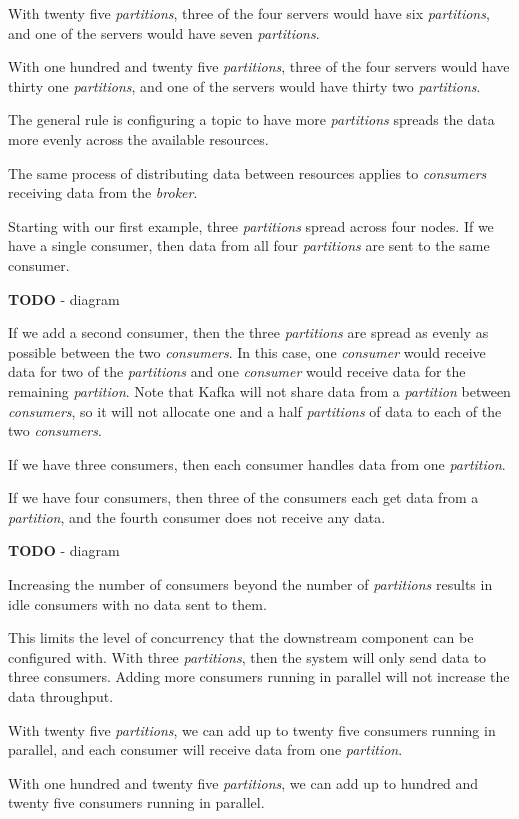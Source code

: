 \documentclass{article}
\newcommand{\kafka} {Kafka\xspace}
\newcommand{\kfbroker} {\textit{broker}\xspace}
\newcommand{\kfconsumer} {\textit{consumer}\xspace}
\newcommand{\kfconsumers} {\textit{consumers}\xspace}
\newcommand{\kfpartition} {\textit{partition}\xspace}
\newcommand{\kfpartitions} {\textit{partitions}\xspace}
\begin{document}
With twenty five \kfpartitions, three of the four servers would have six
\kfpartitions, and one of the servers would have seven \kfpartitions.

With one hundred and twenty five \kfpartitions, three of the four servers would have thirty one \kfpartitions, and one of the servers would have thirty two \kfpartitions.

The general rule is configuring a topic to have more \kfpartitions spreads the data more evenly across the available resources.

The same process of distributing data between resources applies to \kfconsumers receiving data from the \kfbroker.

Starting with our first example, three \kfpartitions spread across four nodes. If we have a single consumer, then data from all four \kfpartitions are sent to the same consumer.

\textbf{TODO} - diagram

If we add a second consumer, then the three \kfpartitions are spread as evenly as possible between the two \kfconsumers. In this case, one \kfconsumer would receive data for two of the \kfpartitions and one \kfconsumer would receive data for the remaining \kfpartition.
Note that \kafka will not share data from a \kfpartition between \kfconsumers, so it will not allocate one and a half \kfpartitions of data to each of the two \kfconsumers.

If we have three consumers, then each consumer handles data from one \kfpartition.

If we have four consumers, then three of the consumers each get data from a \kfpartition, and the fourth consumer does not receive any data.

\textbf{TODO} - diagram

Increasing the number of consumers beyond the number of \kfpartitions
results in idle consumers with no data sent to them.

This limits the level of concurrency that the downstream component can be configured with. With three \kfpartitions, then the system will only send data to three consumers.
Adding more consumers running in parallel will not increase the data throughput.

With twenty five \kfpartitions, we can add up to twenty five consumers running in parallel, and each consumer will receive data from one \kfpartition.

With one hundred and twenty five \kfpartitions, we can add up to hundred and twenty five consumers running in parallel.
\end{document}
